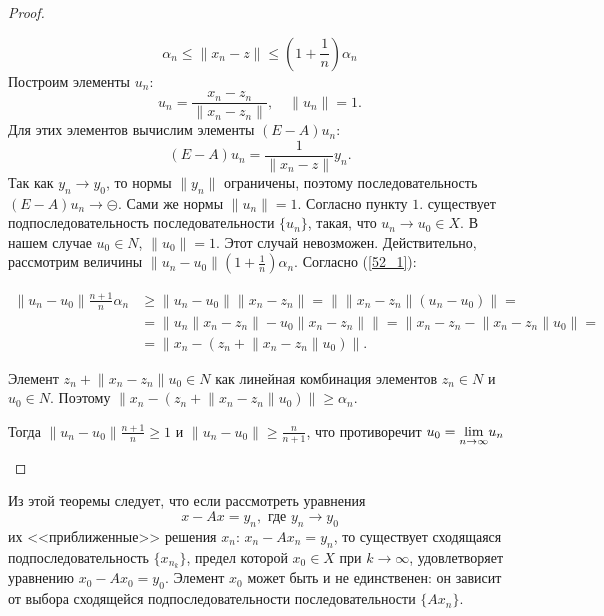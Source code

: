 \documentclass[12pt,a4paper,titlepage,oneside]{book}
\theoremstyle{definition}
\theoremstyle{plain}
\theoremstyle{remark}
\theoremstyle{remark}
\theoremstyle{remark}
\theoremstyle{remark}
\theoremstyle{plain}
\theoremstyle{plain}
\begin{document}
\begin{proof}
\begin{enumerate}
\begin{equation}
\label{52_1}
\alpha_n \leqslant \lVert x_n-z \rVert \leqslant (1+\frac{1}{n})\alpha_n
\end{equation}	
Построим элементы $u_n$: 
$$ u_n = \frac{x_n - z_n}{\lVert x_n - z_n \rVert}, \quad \lVert u_n \rVert = 1.$$
Для этих элементов вычислим элементы $(E-A)u_n$:
\begin{equation*}
(E-A)u_n=\frac{1}{\lVert x_n-z \rVert}y_n.
\end{equation*}	
Так как $y_n \rightarrow y_0$, то нормы $\lVert y_n \rVert$ ограничены, поэтому последовательность $(E-A)u_n \rightarrow \circleddash$. Сами же нормы $\lVert u_n \rVert=1$. Согласно пункту $1.$ существует подпоследовательность последовательности $\{u_n\}$, такая, что $u_n \rightarrow u_0 \in X$. В нашем случае $u_0 \in N$, $\lVert u_0 \rVert=1$. Этот случай невозможен. Действительно, рассмотрим величины $\lVert u_n-u_0 \rVert(1+ \frac{1}{n})\alpha_n$. Согласно (\ref{52_1}):

\begin{align*}
\lVert u_n-u_0 \rVert \frac{n+1}{n} \alpha_n &\geqslant \lVert u_n-u_0 \rVert\lVert x_n-z_n \rVert = \lVert \lVert x_n-z_n \rVert(u_n-u_0) \rVert=\\
&=\lVert u_n\lVert x_n-z_n \rVert-u_0\lVert x_n-z_n \rVert \rVert=\lVert x_n-z_n-\lVert x_n-z_n \rVert u_0 \rVert =\\
&= \lVert x_n-(z_n+\lVert x_n-z_n \rVert u_0) \rVert.
\end{align*}

Элемент $z_n+\lVert x_n-z_n \rVert u_0 \in N$ как линейная комбинация элементов $z_n \in N$ и $u_0 \in N$. Поэтому $\lVert x_n-(z_n+\lVert x_n-z_n \rVert u_0) \rVert \geqslant \alpha_n$.

Тогда $\lVert u_n-u_0 \rVert \frac{n+1}{n} \geqslant 1$ и $\lVert u_n-u_0 \rVert \geqslant\frac{n}{n+1}$, что противоречит $u_0= \smash{\displaystyle\lim_{n \rightarrow \infty}}u_n$
\qedhere
\end{enumerate}
\end{proof}
	
	Из этой теоремы следует, что если рассмотреть уравнения 
	\begin{equation*}
	x-Ax=y_n, \mbox{ где } y_n \rightarrow y_0 
	\end{equation*}	
их <<приближенные>> решения $x_n$: $x_n-Ax_n=y_n$, то существует сходящаяся подпоследовательность $\{x_{n_k}\}$, предел которой $x_0 \in X$ при $k \rightarrow \infty$, удовлетворяет уравнению $x_0-Ax_0=y_0$. Элемент $x_0$ может быть и не единственен: он зависит от выбора сходящейся подпоследовательности последовательности $\{Ax_n\}$.
\end{document}
